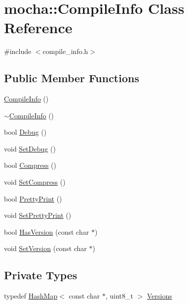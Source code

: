 \hypertarget{classmocha_1_1_compile_info}{
\section{mocha::CompileInfo Class Reference}
\label{classmocha_1_1_compile_info}
}


{\ttfamily \#include $<$compile\_\-info.h$>$}

\subsection*{Public Member Functions}
\begin{DoxyCompactItemize}
\item 
\hyperlink{classmocha_1_1_compile_info_a038e459e848d6fc3e93ea1360441af1b}{CompileInfo} ()
\item 
\hyperlink{classmocha_1_1_compile_info_a57c58e6602d20fdd90646559554bfd16}{$\sim$CompileInfo} ()
\item 
bool \hyperlink{classmocha_1_1_compile_info_a321811247b1add3ce08d8b73d503555c}{Debug} ()
\item 
void \hyperlink{classmocha_1_1_compile_info_ad1234c377e36ae82a2d9002d172f9cc8}{SetDebug} ()
\item 
bool \hyperlink{classmocha_1_1_compile_info_a3fcf9759fec723d024f212fb8e93c8ec}{Compress} ()
\item 
void \hyperlink{classmocha_1_1_compile_info_a6b37953807394182cb2324b2d5b3c089}{SetCompress} ()
\item 
bool \hyperlink{classmocha_1_1_compile_info_af4f28e800fc2c1f5a20763bf4561ae34}{PrettyPrint} ()
\item 
void \hyperlink{classmocha_1_1_compile_info_adc7a7c9cac7bfd9ccbb47fdb8d6dda6c}{SetPrettyPrint} ()
\item 
bool \hyperlink{classmocha_1_1_compile_info_a96a5e7d3d4b9982ec40a04695d5ce779}{HasVersion} (const char $\ast$)
\item 
void \hyperlink{classmocha_1_1_compile_info_ab16d143f0c4998f6c99f3a4f45363fa3}{SetVersion} (const char $\ast$)
\end{DoxyCompactItemize}
\subsection*{Private Types}
\begin{DoxyCompactItemize}
\item 
typedef \hyperlink{classmocha_1_1_hash_map}{HashMap}$<$ const char $\ast$, uint8\_\-t $>$ \hyperlink{classmocha_1_1_compile_info_a6ef64b400937732f51415e1abfb7875e}{Versions}
\end{DoxyCompactItemize}
